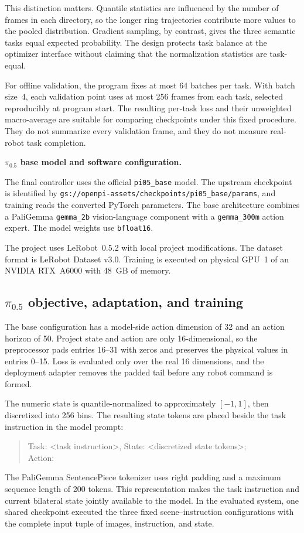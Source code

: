 This distinction matters. Quantile statistics are influenced by the number of
frames in each directory, so the longer ring trajectories contribute more
values to the pooled distribution. Gradient sampling, by contrast, gives the
three semantic tasks equal expected probability. The design protects task
balance at the optimizer interface without claiming that the normalization
statistics are task-equal.

For offline validation, the program fixes at most 64 batches per task. With
batch size~4, each validation point uses at most 256 frames from each task,
selected reproducibly at program start. The resulting per-task loss and their
unweighted macro-average are suitable for comparing checkpoints under this
fixed procedure. They do not summarize every validation frame, and they do not
measure real-robot task completion.

\medskip
\noindent\textbf{\texorpdfstring{$\pi_{0.5}$}{pi0.5} base model and software configuration.}

The final controller uses the official \texttt{pi05\_base} model. The upstream checkpoint is identified by
\nolinkurl{gs://openpi-assets/checkpoints/pi05_base/params},
and training reads the converted PyTorch parameters.
The base architecture combines a PaliGemma \texttt{gemma\_2b} vision-language component with a \texttt{gemma\_300m} action expert. The model weights use \texttt{bfloat16}.

The project uses LeRobot~0.5.2 with local project modifications.
The dataset format is LeRobot Dataset v3.0. Training is executed on physical GPU~1 of an NVIDIA RTX~A6000 with 48~GB of memory.

\subsection{\texorpdfstring{$\pi_{0.5}$}{pi0.5} objective, adaptation, and training}

The base configuration has a model-side action dimension of 32 and an action
horizon of 50. Project state and action are only 16-dimensional, so the
preprocessor pads entries 16--31 with zeros and preserves the physical values
in entries 0--15. Loss is evaluated only over the real 16 dimensions, and the
deployment adapter removes the padded tail before any robot command is formed.

The numeric state is quantile-normalized to approximately \([-1,1]\), then
discretized into 256 bins. The resulting state tokens are placed beside the
task instruction in the model prompt:
\begin{quote}
\small\ttfamily
Task: <task instruction>, State: <discretized state tokens>;\\
Action:
\end{quote}
The PaliGemma SentencePiece tokenizer uses right padding and a maximum sequence
length of 200 tokens. This representation makes the task instruction and
current bilateral state jointly available to the model. In the evaluated
system, one shared checkpoint executed the three fixed scene--instruction
configurations with the complete input tuple of images, instruction, and state.


